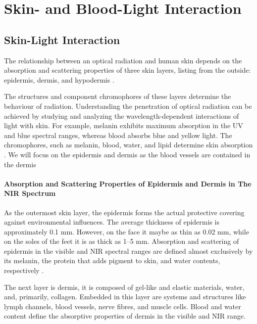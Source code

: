
\chapter{Skin- and Blood-Light Interaction}\label{chapter:Skin- and Blood-Light Interaction}


\section{Skin-Light Interaction}

The relationship between an optical radiation and human skin depends
on the absorption and scattering properties of three skin layers, listing from the outside: epidermis, dermis, and hypodermis \parencite{skin}.
 
The structures and component chromophores of these layers determine the behaviour of radiation. Understanding the penetration of optical radiation can be achieved by studying and analyzing the wavelength-dependent interactions of light with skin. For example, melanin exhibits maximum absorption in the UV and blue spectral
ranges, whereas blood absorbs blue and yellow light. The chromophores, such as melanin, blood, water, and lipid determine skin absorption \parencite{skin1}.
We will focus on the epidermis and dermis as the blood vessels are contained in the dermis

\subsubsection{Absorption and Scattering Properties of Epidermis and Dermis in The NIR Spectrum}

As the outermost skin layer, the epidermis forms the actual protective covering against environmental influences. The average thickness of epidermis is approximately 0.1 mm. However, on the face it maybe as thin as 0.02 mm, while on the soles of the feet it is as thick as 1–5 mm. Absorption and scattering of epidermis in the visible and NIR spectral ranges are defined almost exclusively by its melanin, the protein that adds pigment to skin, and water contents, respectively \parencite{skin1}.

The next layer is dermis, it is composed of gel-like and elastic materials, water, and, primarily, collagen. Embedded in this layer are systems and structures like lymph channels, blood vessels, nerve fibres, and muscle cells. Blood and water content define the absorptive properties of dermis in the visible and NIR range\parencite{skin1}.

